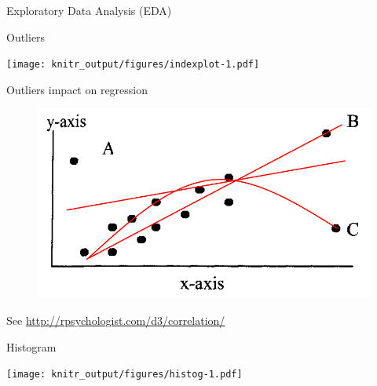 \documentclass[10pt,ignorenonframetext,]{beamer}
\newenvironment{Shaded}{\begin{snugshade}}{\end{snugshade}}
\newcommand{\KeywordTok}[1]{\textcolor[rgb]{0.13,0.29,0.53}{\textbf{{#1}}}}
\newcommand{\DataTypeTok}[1]{\textcolor[rgb]{0.13,0.29,0.53}{{#1}}}
\newcommand{\StringTok}[1]{\textcolor[rgb]{0.31,0.60,0.02}{{#1}}}
\newcommand{\CommentTok}[1]{\textcolor[rgb]{0.56,0.35,0.01}{\textit{{#1}}}}
\newcommand{\NormalTok}[1]{{#1}}
\begin{document}
\begin{frame}[fragile]{Exploratory Data Analysis (EDA)}

Outliers

\begin{Shaded}
\end{Shaded}

\texttt{[image: knitr\_output/figures/indexplot-1.pdf]}

\begin{Shaded}
\end{Shaded}

\end{frame}

\begin{frame}{Outliers impact on regression}

\begin{figure}[htbp]
\centering
\includegraphics{images/reg_outliers.png}
\caption{}
\end{figure}

See \url{http://rpsychologist.com/d3/correlation/}

\end{frame}

\begin{frame}[fragile]{Histogram}

\begin{Shaded}
\end{Shaded}

\texttt{[image: knitr\_output/figures/histog-1.pdf]}

\end{frame}
\end{document}
